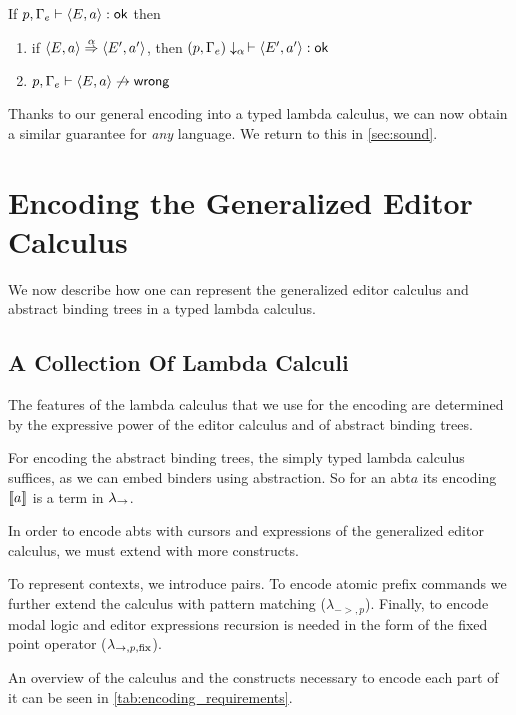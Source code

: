 \documentclass[sigplan]{acmart}
\newcommand{\abt}{\textsf{abt}\xspace}
\begin{document}
\begin{theorem}\label{thm:typesafe}
  If $p, \Gamma_e \vdash \langle E,a \rangle : \textsf{ok}$ then
  \begin{enumerate}
  \item if $\langle E,a \rangle \stackrel{\alpha}{\Rightarrow} \langle E',a' \rangle$, then
    $(p,\Gamma_e)\downarrow_\alpha \, \vdash \langle E',a' \rangle : \textsf{ok}$

  \item $p, \Gamma_e \vdash \langle E,a \rangle \not\to \textsf{wrong}$
  \end{enumerate}
\end{theorem}

Thanks to our general encoding into a typed lambda calculus, we can
now obtain a similar guarantee for \emph{any} language. We return to
this in \cref{sec:sound}.

\section{Encoding the Generalized Editor Calculus} \label{sec:encoding}

We now describe how one can represent the generalized editor calculus
and abstract binding trees in a typed lambda calculus.

\subsection{A Collection Of Lambda Calculi}

The features of the lambda calculus that we use for the encoding are
determined by the expressive power of the editor calculus and of
abstract binding trees.

For encoding the abstract binding trees, the simply typed lambda
calculus suffices, as we can embed binders using abstraction. So for
an \abt $a$ its encoding $\llbracket a \rrbracket$ is a term in $\lambda_{->}$.

In order to encode {\abt}s with cursors and expressions of the
generalized editor calculus, we must extend \stlc with more constructs.

To represent contexts, we introduce pairs. To encode atomic prefix
commands we further extend the calculus with pattern matching
($\lambda_{->,p}$). Finally, to encode modal logic and editor
expressions recursion is needed in the form of the fixed point
operator ($\lambda_{->,p,\text{fix}}$).

An overview of the calculus and the constructs necessary to encode
each part of it can be seen in \cref{tab:encoding_requirements}.
\end{document}
